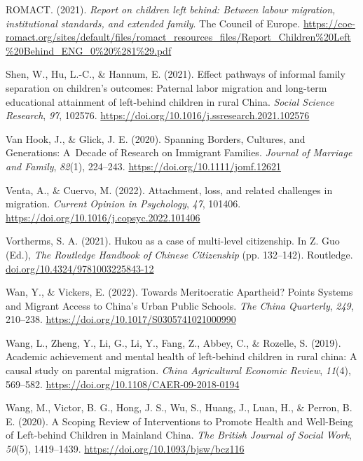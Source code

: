 \documentclass[
  man,floatsintext]{apa7}
\newlength{\cslhangindent}
\newlength{\cslentryspacingunit} %
\newenvironment{CSLReferences}[2] %
 {%
  \setlength{\parindent}{0pt}
  \ifodd #1
  \let\oldpar\par
  \def\par{\hangindent=\cslhangindent\oldpar}
  \fi
  \setlength{\parskip}{#2\cslentryspacingunit}
 }%
 {}
\begin{document}
\begin{CSLReferences}{1}{0}
\leavevmode{}%
ROMACT. (2021). \emph{Report on children left behind: Between labour migration, institutional standards, and extended family}. The Council of Europe. \url{https://coe-romact.org/sites/default/files/romact_resources_files/Report_Children\%20Left\%20Behind_ENG_0\%20\%281\%29.pdf}

\leavevmode{}%
Shen, W., Hu, L.-C., \& Hannum, E. (2021). Effect pathways of informal family separation on children's outcomes: Paternal labor migration and long-term educational attainment of left-behind children in rural China. \emph{Social Science Research}, \emph{97}, 102576. \url{https://doi.org/10.1016/j.ssresearch.2021.102576}

\leavevmode{}%
Van Hook, J., \& Glick, J. E. (2020). Spanning Borders, Cultures, and Generations: A~Decade of Research on Immigrant Families. \emph{Journal of Marriage and Family}, \emph{82}(1), 224--243. \url{https://doi.org/10.1111/jomf.12621}

\leavevmode{}%
Venta, A., \& Cuervo, M. (2022). Attachment, loss, and related challenges in migration. \emph{Current Opinion in Psychology}, \emph{47}, 101406. \url{https://doi.org/10.1016/j.copsyc.2022.101406}

\leavevmode{}%
Vortherms, S. A. (2021). Hukou as a case of multi-level citizenship. In Z. Guo (Ed.), \emph{The Routledge Handbook of Chinese Citizenship} (pp. 132--142). Routledge. \href{https://doi.org/10.4324/9781003225843-12}{doi.org/10.4324/9781003225843-12}

\leavevmode{}%
Wan, Y., \& Vickers, E. (2022). Towards Meritocratic Apartheid? Points Systems and Migrant Access to China's Urban Public Schools. \emph{The China Quarterly}, \emph{249}, 210--238. \url{https://doi.org/10.1017/S0305741021000990}

\leavevmode{}%
Wang, L., Zheng, Y., Li, G., Li, Y., Fang, Z., Abbey, C., \& Rozelle, S. (2019). Academic achievement and mental health of left-behind children in rural china: A causal study on parental migration. \emph{China Agricultural Economic Review}, \emph{11}(4), 569--582. \url{https://doi.org/10.1108/CAER-09-2018-0194}

\leavevmode{}%
Wang, M., Victor, B. G., Hong, J. S., Wu, S., Huang, J., Luan, H., \& Perron, B. E. (2020). A Scoping Review of Interventions to Promote Health and Well-Being of Left-behind Children in Mainland China. \emph{The British Journal of Social Work}, \emph{50}(5), 1419--1439. \url{https://doi.org/10.1093/bjsw/bcz116}


\end{CSLReferences}
\end{document}
